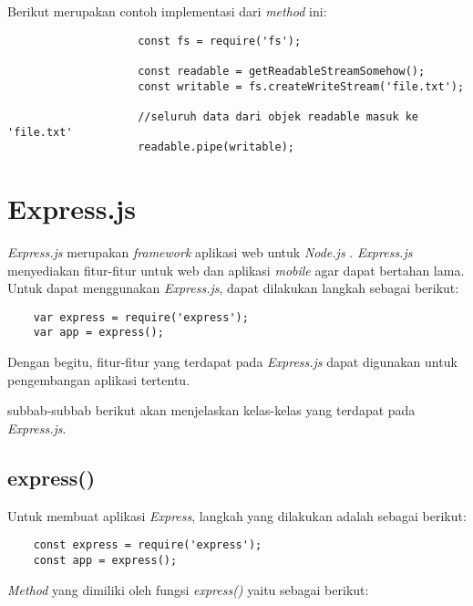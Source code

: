 \begin{enumerate}
\begin{itemize}
\begin{itemize}
				Berikut merupakan contoh implementasi dari \textit{method} ini:
				\begin{lstlisting}
					const fs = require('fs');
					
					const readable = getReadableStreamSomehow();
					const writable = fs.createWriteStream('file.txt');
					
					//seluruh data dari objek readable masuk ke 'file.txt'
					readable.pipe(writable); 
				\end{lstlisting}
				
			\end{itemize}
	\end{itemize}
\end{enumerate}


\section{Express.js}
\label{sec:Express.js}

\textit{Express.js} merupakan \textit{framework} aplikasi web untuk \textit{Node.js} \cite{expressjs}. \textit{Express.js} menyediakan fitur-fitur untuk web dan aplikasi \textit{mobile} agar dapat bertahan lama. Untuk dapat menggunakan \textit{Express.js}, dapat dilakukan langkah sebagai berikut: 
\begin{lstlisting}
	var express = require('express');
	var app = express();
\end{lstlisting}

Dengan begitu, fitur-fitur yang terdapat pada \textit{Express.js} dapat digunakan untuk pengembangan aplikasi tertentu.

subbab-subbab berikut akan menjelaskan kelas-kelas yang terdapat pada \textit{Express.js}.

\subsection{express()}
Untuk membuat aplikasi \textit{Express}, langkah yang dilakukan adalah sebagai berikut:
\begin{lstlisting}
	const express = require('express');
	const app = express();
\end{lstlisting}

\textit{Method} yang dimiliki oleh fungsi \textit{express()} yaitu sebagai berikut:

